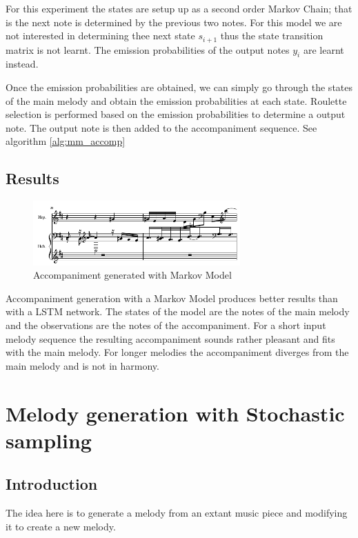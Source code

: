 For this experiment the states are setup up as a second order Markov Chain; that is the next note is determined by the previous two notes. For this model we are not interested in determining thee next state $s_{i+1}$ thus the state transition matrix is not learnt. The emission probabilities of the output notes $y_i$ are learnt instead.

Once the emission probabilities are obtained, we can simply go through the states of the main melody and obtain the emission probabilities at each state. Roulette selection is performed based on the emission probabilities to determine a output note. The output note is then added to the accompaniment sequence. See algorithm \ref{alg:mm_accomp}



\section{Results}
\begin{figure}[h!]
\centerline{\includegraphics[width=300px]{../images/markov_model_accomp.pdf}}
\caption{Accompaniment generated with Markov Model}
\label{ims:hmm_accomp}
\end{figure}

Accompaniment generation with a Markov Model produces better results than with a \ac{LSTM} network. The states of the model are the notes of the main melody and the observations are the notes of the accompaniment. For a short input melody sequence the resulting accompaniment sounds rather pleasant and fits with the main melody. For longer melodies the accompaniment diverges from the main melody and is not in harmony.




\chapter{Melody generation with Stochastic sampling}
\section{Introduction}
The idea here is to generate a melody from an extant music piece and modifying it to create a new melody. 

